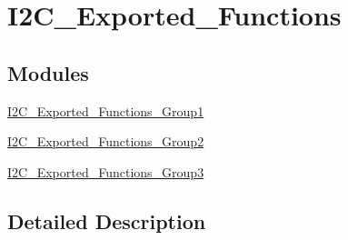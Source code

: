 \hypertarget{group___i2_c___exported___functions}{}\section{I2\+C\+\_\+\+Exported\+\_\+\+Functions}
\label{group___i2_c___exported___functions}
\subsection*{Modules}
\begin{DoxyCompactItemize}
\item 
\mbox{\hyperlink{group___i2_c___exported___functions___group1}{I2\+C\+\_\+\+Exported\+\_\+\+Functions\+\_\+\+Group1}}
\item 
\mbox{\hyperlink{group___i2_c___exported___functions___group2}{I2\+C\+\_\+\+Exported\+\_\+\+Functions\+\_\+\+Group2}}
\item 
\mbox{\hyperlink{group___i2_c___exported___functions___group3}{I2\+C\+\_\+\+Exported\+\_\+\+Functions\+\_\+\+Group3}}
\end{DoxyCompactItemize}


\subsection{Detailed Description}
